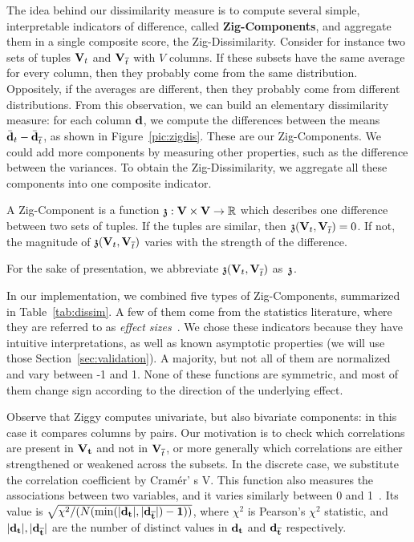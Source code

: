 The idea behind our dissimilarity measure is to compute several simple,
interpretable indicators of difference, called \textbf{Zig-Components}, and
aggregate them in a single composite score, the Zig-Dissimilarity.  Consider
for instance two sets of tuples $\mathbf{V}_t$ and $\mathbf{V}_{\overline{t}}$ with $V$
columns. If these subsets have the same average for every column, then they
probably come from the same distribution. Oppositely, if the averages are
different, then they probably come from different distributions. From this
observation, we can build an elementary dissimilarity measure: for each column
$\bf{d}$, we compute the differences between the means $\bar{\bf{d}}_t -
\bar{\bf{d}}_{\overline{t}}$, as shown in Figure~\ref{pic:zigdis}. These are our
Zig-Components. We could add more components by measuring other properties,
such as the difference between the variances. To obtain the  Zig-Dissimilarity,
we aggregate all these components into one composite indicator.
\begin{definition}
    A Zig-Component is a function $\mathfrak{z} : \mathbf{V}\times\mathbf{V} \to \mathbb{R}$
    which describes one difference between two sets of tuples. If the tuples
    are similar, then $\mathfrak{z}(\mathbf{V}_t, \mathbf{V}_{\overline{t}}) = 0$. If not,
    the magnitude of $\mathfrak{z}(\mathbf{V}_t, \mathbf{V}_{\overline{t}})$ varies with the strength
    of the difference.
\end{definition}
For the sake of presentation, we  abbreviate $\mathfrak{z}(\mathbf{V}_t, \mathbf{V}_{\overline{t}})$
as~$\mathfrak{z}$.

In our implementation, we combined five types of Zig-Com\-po\-nents, summarized
in Table~\ref{tab:dissim}.  A few of them come from the statistics literature,
where they are referred to as \emph{effect sizes}~\cite{cohen1977statistical,
hedges2014statistical}.  We chose these indicators because they have intuitive
interpretations, as well as known asymptotic properties (we will use those
Section~\ref{sec:validation}).  A majority, but not all of them are normalized
and vary between -1 and 1. None of these functions are symmetric, and most of
them change sign according to the direction of the underlying effect.

Observe that Ziggy computes univariate, but also bivariate components: in this
case it compares columns by pairs. Our motivation is to check which
correlations are present in $\bf{V}_t$ and not in $\mathbf{V}_{\overline{t}}$, or more
generally which correlations are either strengthened or weakened across the
subsets. In the discrete case, we substitute the correlation coefficient by
Cram\'er' s V.  This function also measures the associations between two
variables, and it varies similarly between 0 and 1~\cite{cohen1977statistical}.
Its value is $\sqrt{\chi^2/(N(\min(|\bf{d}_t|,|\bf{d}_{\overline{t}}|) - 1))}$, where
$\chi^2$ is Pearson's $\chi^2$ statistic, and $|\bf{d}_t|,|\bf{d}_{\overline{t}}|$ are
the number of distinct values in $\bf{d}_t$ and $\bf{d}_{\overline{t}}$ respectively.


